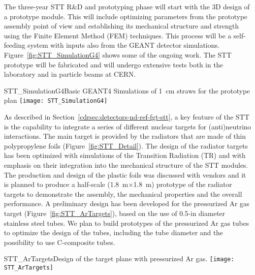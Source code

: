 The three-year STT R\&D and prototyping phase will start with the 3D
design of a prototype module.  This will include optimizing
parameters from the prototype assembly point of view and
establishing its mechanical structure and strength using the Finite Element Method (FEM) 
techniques. This process will be a self-feeding system with inputs
also from the GEANT detector simulations.
Figure~\ref{fig:STT_SimulationG4} shows some of the ongoing work. 
The STT prototype will be fabricated and  will undergo %
extensive tests both in the laboratory and %
in particle
beams at CERN.

\begin{cdrfigure}
{STT_SimulationG4}{Basic GEANT4 Simulations of 1~cm straws for the prototype plan}
\texttt{[image: STT\_SimulationG4]}
\end{cdrfigure}


As described in Section~\ref{cdrsec:detectors-nd-ref-fgt-stt}, a key
feature of the STT is the capability to integrate a series of
different nuclear targets for (anti)neutrino interactions.  The main
target is provided by the radiators that are made of thin polypropylene foils
(Figure~\ref{fig:STT_Detail}).  The design of the radiator targets has
been optimized with simulations of the Transition Radiation (TR) and
with emphasis on their integration into the mechanical structure of
the STT modules.  The production and design of the plastic foils was
discussed with vendors and %
it is planned to produce a half-scale
(1.8~m$\times$1.8~m) prototype of the radiator targets to demonstrate
the assembly, the mechanical properties and the overall
performance.
A preliminary design has been developed for the
pressurized Ar gas target (Figure~\ref{fig:STT_ArTargets}), based on
the use of 0.5-in diameter stainless steel tubes.
We plan to build prototypes of the pressurized Ar gas tubes to 
optimize the design of the tubes, including the tube diameter
and the possibility to use C-composite tubes. 
\begin{cdrfigure}
{STT_ArTargets}{Design of the target plane with pressurized Ar gas.}
\texttt{[image: STT\_ArTargets]}
\end{cdrfigure}

